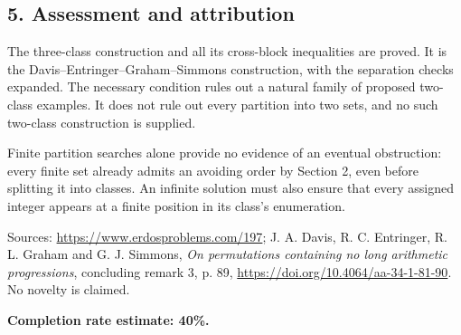 \subsection*{5. Assessment and attribution}
The three-class construction and all its cross-block inequalities are proved. It is the Davis--Entringer--Graham--Simmons construction, with the separation checks expanded. The necessary condition rules out a natural family of proposed two-class examples. It does not rule out every partition into two sets, and no such two-class construction is supplied.

Finite partition searches alone provide no evidence of an eventual obstruction: every finite set already admits an avoiding order by Section 2, even before splitting it into classes. An infinite solution must also ensure that every assigned integer appears at a finite position in its class's enumeration.

Sources: \url{https://www.erdosproblems.com/197}; J. A. Davis, R. C. Entringer, R. L. Graham and G. J. Simmons, \emph{On permutations containing no long arithmetic progressions}, concluding remark 3, p. 89, \url{https://doi.org/10.4064/aa-34-1-81-90}. No novelty is claimed.

\textbf{Completion rate estimate: 40\%.}

